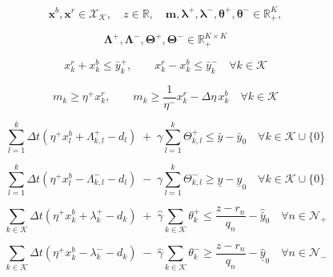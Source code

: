 \documentclass[11pt]{ctexart}
\begin{document}
\begin{equation}
\boldsymbol{x}^b,\boldsymbol{x}^r \in \mathcal{X}_{\mathcal K},\quad
z \in \mathbb{R},\quad
\boldsymbol{m},\boldsymbol{\lambda}^+,\boldsymbol{\lambda}^-,
\boldsymbol{\theta}^+,\boldsymbol{\theta}^- \in \mathbb{R}_+^K,
\tag{LP-a}
\end{equation}

\begin{equation}
\boldsymbol{\Lambda}^+,\boldsymbol{\Lambda}^-,
\boldsymbol{\Theta}^+,\boldsymbol{\Theta}^- \in \mathbb{R}_+^{K \times K}
\tag{LP-b}
\end{equation}

\begin{equation}
x_k^r + x_k^b \le \bar y_k^+,\qquad
x_k^r - x_k^b \le \bar y_k^-
\quad \forall k \in \mathcal K
\tag{27}
\end{equation}

\begin{equation}
m_k \ge \eta^+ x_k^r,\qquad
m_k \ge \frac{1}{\eta^-}x_k^r - \Delta\eta\,x_k^b
\quad \forall k \in \mathcal K
\tag{28}
\end{equation}

\begin{equation}
\sum_{l=1}^{k} \Delta t \left( \eta^+x_l^b + \Lambda_{k,l}^+ - d_l \right)
\;+\; \gamma \sum_{l=1}^{k} \Theta_{k,l}^+
\le \bar y - \bar y_0
\quad \forall k \in \mathcal K \cup \{0\}
\tag{29}
\end{equation}

\begin{equation}
\sum_{l=1}^{k} \Delta t \left( \eta^+x_l^b - \Lambda_{k,l}^- - d_l \right)
\;-\; \gamma \sum_{l=1}^{k} \Theta_{k,l}^-
\ge \underline y - \underline y_0
\quad \forall k \in \mathcal K \cup \{0\}
\tag{30}
\end{equation}

\begin{equation}
\sum_{k \in \mathcal K} \Delta t \left( \eta^+x_k^b + \lambda_k^+ - d_k \right)
\;+\; \hat{\gamma}\sum_{k \in \mathcal K}\theta_k^+
\le \frac{z - r_n}{q_n} - \hat{\bar y}_0
\quad \forall n \in \mathcal N_+
\tag{31}
\end{equation}

\begin{equation}
\sum_{k \in \mathcal K} \Delta t \left( \eta^+x_k^b - \lambda_k^- - d_k \right)
\;-\; \hat{\gamma}\sum_{k \in \mathcal K}\theta_k^-
\ge \frac{z - r_n}{q_n} - \hat{\underline y}_0
\quad \forall n \in \mathcal N_-
\tag{32}
\end{equation}
\end{document}
